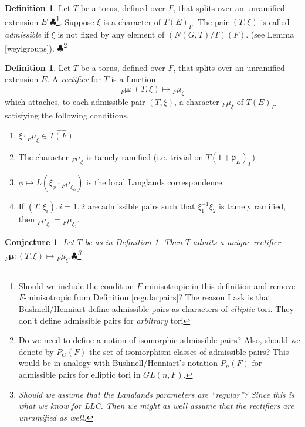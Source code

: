 \documentclass[11pt]{amsart}
\theoremstyle{plain}
\newtheorem{conjecture}[theorem]{Conjecture}
\newcommand{\MAxxx}[1]{$\clubsuit$\footnote{#1}}
\theoremstyle{definition}
\newtheorem{definition}[theorem]{Definition}
\begin{document}
\begin{definition}\label{admissibledefinition}
Let $T$ be a torus, defined over $F$, that splits over an unramified
  extension $E$ \MAxxx{Should we include the condition $F$-minisotropic
  in this definition and remove $F$-minisotropic from Definition \ref{regularpairs}?
  The reason I ask is that Bushnell/Henniart define admissible pairs as characters
  of \emph{elliptic} tori.  They don't define admissible pairs for \emph{arbitrary}
  tori}.  Suppose $\xi$ is a character of $T(E)_{\Gamma}$.
The pair $(T, \xi)$ is called \emph{admissible} if $\xi$ is not fixed
by any element of $(N(G,T)/T)(F)$. (see Lemma \ref{weylgroups}). \MAxxx{Do we need
to define a notion of isomorphic admissible pairs?  Also, should we
denote by $P_G(F)$ the set of isomorphism classes of admissible pairs?  This
would be in analogy with Bushnell/Henniart's notation $P_n(F)$ for admissible
pairs for elliptic tori in $GL(n,F)$.}
\end{definition}

\begin{definition}\label{rectifierdefinition}
  Let $T$ be a torus, defined over $F$, that splits over an unramified
  extension $E$.  A \emph{rectifier} for $T$ is a function $${}_F
  \boldsymbol\mu : (T, \xi) \mapsto {}_F \mu_{\xi}$$ which attaches,
  to each admissible pair $(T, \xi)$, a character ${}_F
  \mu_{\xi}$ of $T(E)_{\Gamma}$ satisfying the following conditions.

\begin{enumerate}
\item $\xi \cdot {}_F \mu_{\xi} \in \widehat{T(F)}$

\item The character ${}_F \mu_{\xi}$ is tamely ramified (i.e. trivial on
  $T(1 + \mathfrak{p}_E)_{\Gamma}$)

\item $\phi \mapsto L(\xi_{\phi} \cdot {}_F \mu_{\xi_{\phi}})$
  is the local Langlands correspondence.

\item If $(T, \xi_i), i = 1,2$ are admissible pairs  such that
$\xi_1^{-1} \xi_2$ is tamely ramified, then
${}_F \mu_{\xi_1} = {}_F \mu_{\xi_2}$.
\end{enumerate}

\end{definition}

\begin{conjecture}
  Let $T$ be as in Definition \ref{rectifierdefinition}.  Then $T$
  admits a unique rectifier ${}_F \boldsymbol\mu : (T, \xi) \mapsto
  {}_F \mu_{\xi}$.\MAxxx{Should we assume that the Langlands parameters
  are ``regular''?  Since this is what we know for LLC.  Then we might
  as well assume that the rectifiers are unramified as well.}
\end{conjecture}
\end{document}
